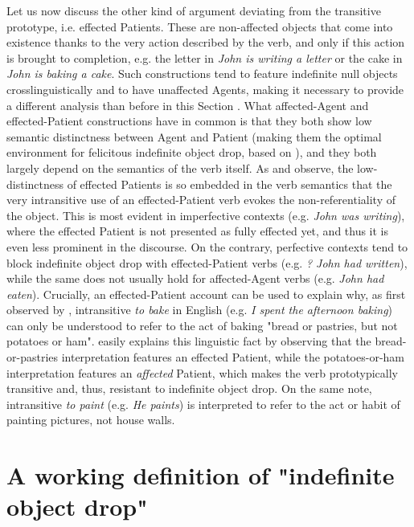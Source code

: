 Let us now discuss the other kind of argument deviating from the transitive prototype, i.e. effected Patients. These are non-affected objects that come into existence thanks to the very action described by the verb, and only if this action is brought to completion, e.g. the letter in \textit{John is writing a letter} or the cake in \textit{John is baking a cake}. Such constructions tend to feature indefinite null objects crosslinguistically and to have unaffected Agents, making it necessary to provide a different analysis than before in this Section \parencite[127-128]{Naess2007}. What affected-Agent and effected-Patient constructions have in common is that they both show low semantic distinctness between Agent and Patient (making them the optimal environment for felicitous indefinite object drop, based on \textcite{HopperThompson1980}), and they both largely depend on the semantics of the verb itself. As \textcite[127]{Naess2007} and \textcite[421]{Naess2011} observe, the low-distinctness of effected Patients is so embedded in the verb semantics that the very intransitive use of an effected-Patient verb evokes the non-referentiality of the object. This is most evident in imperfective contexts (e.g. \textit{John was writing}), where the effected Patient is not presented as fully effected yet, and thus it is even less prominent in the discourse. On the contrary, perfective contexts tend to block indefinite object drop with effected-Patient verbs (e.g. \textit{? John had written}), while the same does not usually hold for affected-Agent verbs (e.g. \textit{John had eaten}). Crucially, an effected-Patient account can be used to explain why, as first observed by \textcite[96]{Fillmore1986}, intransitive \textit{to bake} in English (e.g. \textit{I spent the afternoon baking}) can only be understood to refer to the act of baking "bread or pastries, but not potatoes or ham". \textcite[135]{Naess2007} easily explains this linguistic fact by observing that the bread-or-pastries interpretation features an effected Patient, while the potatoes-or-ham interpretation features an \textit{affected} Patient, which makes the verb prototypically transitive and, thus, resistant to indefinite object drop. On the same note, intransitive \textit{to paint} (e.g. \textit{He paints}) is interpreted to refer to the act or habit of painting pictures, not house walls.


\section{A working definition of "indefinite object drop"} 

